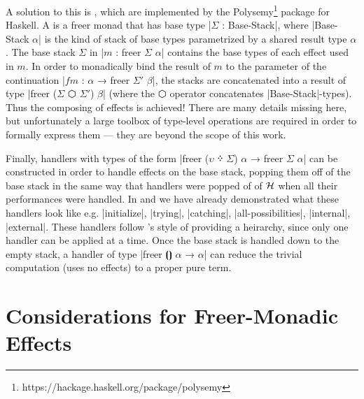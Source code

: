 A solution to this is , which are implemented by the Polysemy\footnote{https://hackage.haskell.org/package/polysemy} package for Haskell.
A  is a freer monad that has base type \code|$Σ$ : Base-Stack|,
where \code|Base-Stack $α$| is the kind of stack of base types parametrized by a shared result type $α$.
The base stack $Σ$ in \code|$m$ : freer $Σ$ $α$| contains the base types of each effect used in $m$.
In order to monadically bind the result of $m$ to the parameter of the continuation \code|$fm$ : $α$ → freer $Σ'$ $β$|, the stacks are concatenated into a result of type \code|freer ($Σ$ $⬡$ $Σ'$) $β$| (where the $⬡$ operator concatenates \code|Base-Stack|-types).
Thus the composing of effects is achieved!
There are many details missing here, but unfortunately a large toolbox of type-level operations are required in order to formally express them --- they are beyond the scope of this work.

Finally, handlers with types of the form \code|freer ($υ$ ᠅ $Σ$) $α$ → freer $Σ$ $α$| can be constructed in order to handle effects on the base stack, popping them off of the base stack in the same way that handlers were popped of of $\mathcal{H}$ when all their performances were handled.
In \LangC and \LangE we have already demonstrated what these handlers look like e.g. \code|initialize|, \code|trying|, \code|catching|, \code|all-possibilities|, \code|internal|, \code|external|.
These handlers follow \LangD's style of providing a heirarchy, since only one handler can be applied at a time.
Once the base stack is handled down to the empty stack, a handler of type \code|freer $⦗⦘$ $α$ → $α$| can reduce the trivial computation (uses no effects) to a proper pure term.

\section{Considerations for Freer-Monadic Effects}

